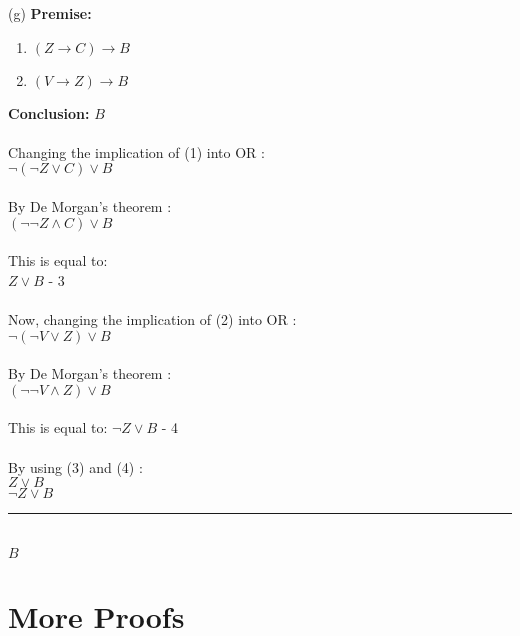 \documentclass{article}
\begin{document}
(g) \textbf{Premise:} \\
\begin{enumerate}
\item $(Z \rightarrow C) \rightarrow B$
\item $(V \rightarrow Z) \rightarrow B$
\end{enumerate}

\textbf{Conclusion:} 
$B$ \\
\\
Changing the implication of (1) into OR : \\
$\neg(\neg Z \vee C) \vee B$ \\
\\
By De Morgan's theorem : \\
$(\neg \neg Z \wedge C)  \vee B$ \\
\\
This is equal to: \\
$Z \vee B$ - 3\\
\\
Now, changing the implication of (2) into OR : \\
$\neg (\neg V \vee Z) \vee B$\\
\\
By De Morgan's theorem : \\
$ (\neg \neg V \wedge Z) \vee B$\\
\\
This is equal to:
$ \neg Z \vee B$ - 4\\
\\
By using (3) and (4) :\\
$Z \vee B$ \\
$ \neg Z \vee B$ \\
\noindent\rule{1.9cm}{0.4pt}\\
$ B $



\section{More Proofs}
\end{document}
